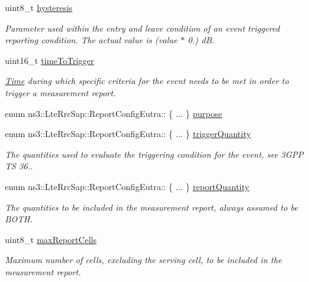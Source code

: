 \begin{DoxyCompactItemize}
uint8\+\_\+t \hyperlink{structns3_1_1LteRrcSap_1_1ReportConfigEutra_a1fb9169ea261ba20af6a0c18fcc04fa9}{hysteresis}
\begin{DoxyCompactList}\small\item\em Parameter used within the entry and leave condition of an event triggered reporting condition. The actual value is (value $\ast$ 0.) dB. \end{DoxyCompactList}\item 
uint16\+\_\+t \hyperlink{structns3_1_1LteRrcSap_1_1ReportConfigEutra_aee64b76b166b1beda5bbe1760363ed24}{time\+To\+Trigger}
\begin{DoxyCompactList}\small\item\em \hyperlink{classns3_1_1Time}{Time} during which specific criteria for the event needs to be met in order to trigger a measurement report. \end{DoxyCompactList}\item 
enum ns3\+::\+Lte\+Rrc\+Sap\+::\+Report\+Config\+Eutra\+:: \{ ... \}  \hyperlink{structns3_1_1LteRrcSap_1_1ReportConfigEutra_a606ee524fac01f508f747892e377e07d}{purpose}
\item 
enum ns3\+::\+Lte\+Rrc\+Sap\+::\+Report\+Config\+Eutra\+:: \{ ... \}  \hyperlink{structns3_1_1LteRrcSap_1_1ReportConfigEutra_a735700933e50f1b4680f856d37c777f9}{trigger\+Quantity}
\begin{DoxyCompactList}\small\item\em The quantities used to evaluate the triggering condition for the event, see 3\+G\+PP TS 36.. \end{DoxyCompactList}\item 
enum ns3\+::\+Lte\+Rrc\+Sap\+::\+Report\+Config\+Eutra\+:: \{ ... \}  \hyperlink{structns3_1_1LteRrcSap_1_1ReportConfigEutra_a0ee165efb82a05284ca7718ec1387aca}{report\+Quantity}
\begin{DoxyCompactList}\small\item\em The quantities to be included in the measurement report, always assumed to be B\+O\+TH. \end{DoxyCompactList}\item 
uint8\+\_\+t \hyperlink{structns3_1_1LteRrcSap_1_1ReportConfigEutra_a1481b0d3484ffe7852fdb4c6300d340c}{max\+Report\+Cells}
\begin{DoxyCompactList}\small\item\em Maximum number of cells, excluding the serving cell, to be included in the measurement report. \end{DoxyCompactList}\item 

\end{DoxyCompactItemize}
